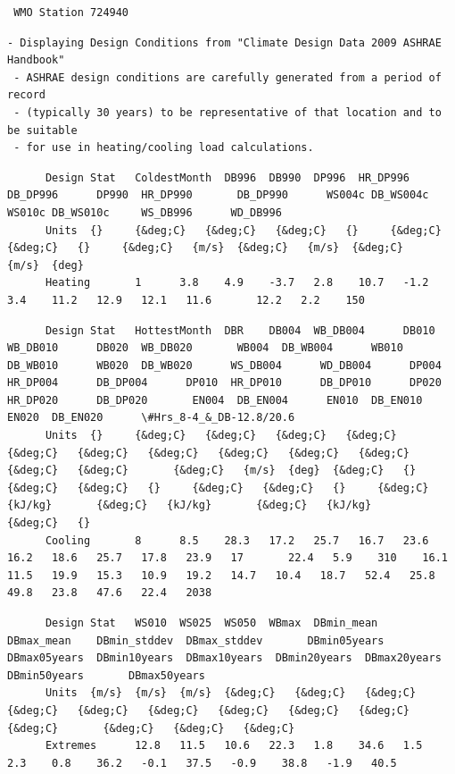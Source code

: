 \begin{lstlisting}
 WMO Station 724940
\end{lstlisting}

\begin{lstlisting}
- Displaying Design Conditions from "Climate Design Data 2009 ASHRAE Handbook"
 - ASHRAE design conditions are carefully generated from a period of record
 - (typically 30 years) to be representative of that location and to be suitable
 - for use in heating/cooling load calculations.
\end{lstlisting}

\begin{lstlisting}
      Design Stat   ColdestMonth  DB996  DB990  DP996  HR_DP996      DB_DP996      DP990  HR_DP990       DB_DP990      WS004c DB_WS004c     WS010c DB_WS010c     WS_DB996      WD_DB996
      Units  {}     {&deg;C}   {&deg;C}   {&deg;C}   {}     {&deg;C}   {&deg;C}   {}     {&deg;C}   {m/s}  {&deg;C}   {m/s}  {&deg;C}       {m/s}  {deg}
      Heating       1      3.8    4.9    -3.7   2.8    10.7   -1.2   3.4    11.2   12.9   12.1   11.6       12.2   2.2    150
\end{lstlisting}

\begin{lstlisting}
      Design Stat   HottestMonth  DBR    DB004  WB_DB004      DB010  WB_DB010      DB020  WB_DB020       WB004  DB_WB004      WB010  DB_WB010      WB020  DB_WB020      WS_DB004      WD_DB004      DP004       HR_DP004      DB_DP004      DP010  HR_DP010      DB_DP010      DP020  HR_DP020      DB_DP020       EN004  DB_EN004      EN010  DB_EN010      EN020  DB_EN020      \#Hrs_8-4_&_DB-12.8/20.6
      Units  {}     {&deg;C}   {&deg;C}   {&deg;C}   {&deg;C}   {&deg;C}   {&deg;C}   {&deg;C}   {&deg;C}   {&deg;C}   {&deg;C}   {&deg;C}   {&deg;C}       {&deg;C}   {m/s}  {deg}  {&deg;C}   {}     {&deg;C}   {&deg;C}   {}     {&deg;C}   {&deg;C}   {}     {&deg;C}   {kJ/kg}       {&deg;C}   {kJ/kg}       {&deg;C}   {kJ/kg}       {&deg;C}   {}
      Cooling       8      8.5    28.3   17.2   25.7   16.7   23.6   16.2   18.6   25.7   17.8   23.9   17       22.4   5.9    310    16.1   11.5   19.9   15.3   10.9   19.2   14.7   10.4   18.7   52.4   25.8       49.8   23.8   47.6   22.4   2038
\end{lstlisting}

\begin{lstlisting}
      Design Stat   WS010  WS025  WS050  WBmax  DBmin_mean    DBmax_mean    DBmin_stddev  DBmax_stddev       DBmin05years  DBmax05years  DBmin10years  DBmax10years  DBmin20years  DBmax20years  DBmin50years       DBmax50years
      Units  {m/s}  {m/s}  {m/s}  {&deg;C}   {&deg;C}   {&deg;C}   {&deg;C}   {&deg;C}   {&deg;C}   {&deg;C}   {&deg;C}   {&deg;C}   {&deg;C}       {&deg;C}   {&deg;C}   {&deg;C}
      Extremes      12.8   11.5   10.6   22.3   1.8    34.6   1.5    2.3    0.8    36.2   -0.1   37.5   -0.9    38.8   -1.9   40.5
\end{lstlisting}


